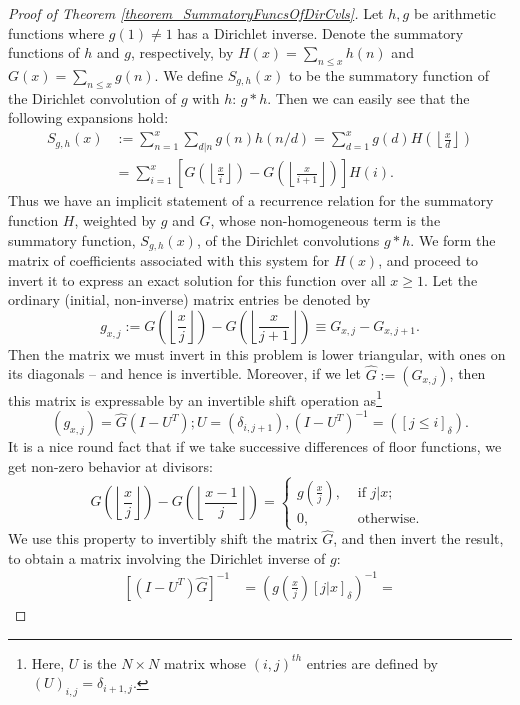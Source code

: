 \documentclass[11pt,reqno,a4letter]{article}
\numberwithin{figure}{section}
\numberwithin{table}{section}
\newcommand{\Iverson}[1]{\ensuremath{\left[#1\right]_{\delta}}}
\newcommand{\floor}[1]{\left\lfloor #1 \right\rfloor}
\theoremstyle{plain}
\numberwithin{theorem}{section}
\theoremstyle{definition}
\begin{document}
\begin{proof}[Proof of Theorem \ref{theorem_SummatoryFuncsOfDirCvls}]
Let $h,g$ be arithmetic functions where $g(1) \neq 1$ has a Dirichlet inverse. Denote the summatory functions of $h$ and $g$, 
respectively, by $H(x) = \sum_{n \leq x} h(n)$ and $G(x) = \sum_{n \leq x} g(n)$. 
We define $S_{g,h}(x)$ to be the summatory function of the Dirichlet convolution of $g$ with $h$: $g \ast h$. 
Then we can easily see that the following expansions hold: 
\begin{align*} 
S_{g,h}(x) & := \sum_{n=1}^{x} \sum_{d|n} g(n) h(n/d) = \sum_{d=1}^x g(d) H\left(\floor{\frac{x}{d}}\right) \\ 
     & = \sum_{i=1}^x \left[G\left(\floor{\frac{x}{i}}\right) - G\left(\floor{\frac{x}{i+1}}\right)\right] H(i). 
\end{align*} 
Thus we have an implicit statement of a recurrence relation for the summatory function $H$, weighted by $g$ and $G$, 
whose non-homogeneous term is the summatory function, $S_{g,h}(x)$, of the Dirichlet convolutions $g \ast h$. 
We form the matrix of coefficients associated with this system for $H(x)$, and proceed to invert it to express an 
exact solution for this function over all $x \geq 1$. Let the ordinary (initial, non-inverse) matrix entries be denoted by 
\[
g_{x,j} := G\left(\floor{\frac{x}{j}}\right) - G\left(\floor{\frac{x}{j+1}}\right) \equiv G_{x,j} - G_{x,j+1}. 
\]
Then the matrix we must invert in this problem is lower triangular, with ones on its diagonals -- and hence is invertible. 
Moreover, if we let $\hat{G} := (G_{x,j})$, then this matrix is 
expressable by an invertible shift operation as\footnote{ 
     Here, $U$ is the $N \times N$ matrix whose $(i,j)^{th}$ entries are defined by 
     $(U)_{i,j} = \delta_{i+1,j}$. 
}
\[
(g_{x,j}) = \hat{G} (I - U^{T}); U = (\delta_{i,j+1}), (I - U^T)^{-1} = (\Iverson{j \leq i}). 
\]
It is a nice round fact that if we take successive differences of floor functions, we get non-zero behavior at divisors: 
\[
G\left(\floor{\frac{x}{j}}\right) - G\left(\floor{\frac{x-1}{j}}\right) = 
     \begin{cases} 
     g\left(\frac{x}{j}\right), & \text{ if $j | x$; } \\ 
     0, & \text{ otherwise. } 
     \end{cases}
\]
We use this property to invertibly shift the matrix $\hat{G}$, and then invert the result, to obtain a matrix involving the 
Dirichlet inverse of $g$: 
\begin{align*} 
\left[(I-U^{T}) \hat{G}\right]^{-1} & = \left(g\left(\frac{x}{j}\right) \Iverson{j|x}\right)^{-1} = 

\end{align*}
\end{proof}
\end{document}
